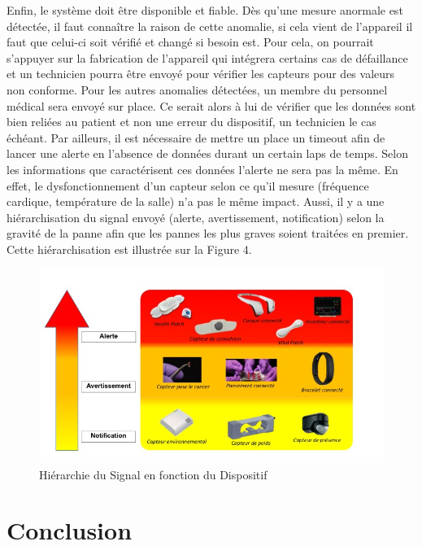 \documentclass{article}
\begin{document}
Enfin, le système doit être disponible et fiable. Dès qu’une mesure anormale est détectée, il faut connaître la raison de cette anomalie, si cela vient de l'appareil il faut que celui-ci soit vérifié et changé si besoin est. Pour cela, on pourrait s’appuyer sur la fabrication de l'appareil qui intégrera certains cas de défaillance et un technicien pourra être envoyé pour vérifier les capteurs pour des valeurs non conforme. Pour les autres anomalies détectées, un membre du personnel médical sera envoyé sur place. Ce serait alors à lui de vérifier que les données sont bien reliées au patient et non une erreur du dispositif, un technicien le cas échéant. Par ailleurs, il est nécessaire de mettre un place un timeout afin de lancer une alerte en l’absence de données durant un certain laps de temps. Selon les informations que caractérisent ces données l’alerte ne sera pas la même. En effet, le dysfonctionnement d’un capteur selon ce qu’il mesure (fréquence cardique, température de la salle) n’a pas le même impact. Aussi, il y a une hiérarchisation du signal envoyé (alerte, avertissement, notification) selon la gravité de la panne afin que les pannes les plus graves soient traitées en premier. Cette hiérarchisation est illustrée sur la Figure 4.

\begin{figure}[h!]
	\hspace*{-2.5cm}
	\centering
	\includegraphics[width=1.5\textwidth]{Figure4.jpg}
	\caption{Hiérarchie du Signal en fonction du Dispositif}
	\label{fig:balance}
\end{figure}


\section{ Conclusion }
 







\end{document}
